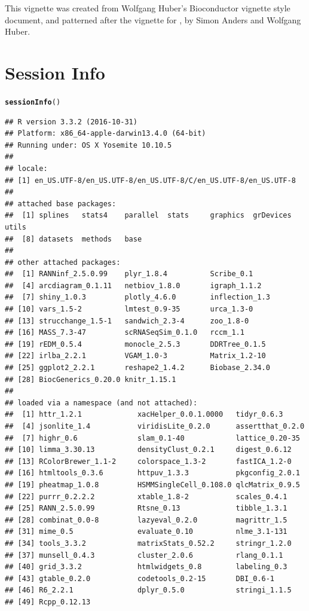 \documentclass[10pt,oneside]{article}\usepackage[]{graphicx}\usepackage[]{color}
\makeatletter
\newcommand{\hlstd}[1]{\textcolor[rgb]{0.345,0.345,0.345}{#1}}%
\newcommand{\hlkwd}[1]{\textcolor[rgb]{0.737,0.353,0.396}{\textbf{#1}}}%
\newenvironment{kframe}{%
 \def\at@end@of@kframe{}%
 \ifinner\ifhmode%
  \def\at@end@of@kframe{\end{minipage}}%
  \begin{minipage}{\columnwidth}%
 \fi\fi%
 \def\FrameCommand##1{\hskip\@totalleftmargin \hskip-\fboxsep
 \colorbox{shadecolor}{##1}\hskip-\fboxsep
     \hskip-\linewidth \hskip-\@totalleftmargin \hskip\columnwidth}%
 \MakeFramed {\advance\hsize-\width
   \@totalleftmargin\z@ \linewidth\hsize
   \@setminipage}}%
 {\par\unskip\endMakeFramed%
 \at@end@of@kframe}
\newenvironment{knitrout}{}{} %
\makeatother
\begin{document}
This vignette was created from Wolfgang Huber's Bioconductor vignette style document, and patterned after the vignette for , by Simon Anders and Wolfgang Huber.

\section{Session Info}
\begin{knitrout}
\color{fgcolor}\begin{kframe}
\begin{alltt}
\hlkwd{sessionInfo}\hlstd{()}
\end{alltt}
\begin{verbatim}
## R version 3.3.2 (2016-10-31)
## Platform: x86_64-apple-darwin13.4.0 (64-bit)
## Running under: OS X Yosemite 10.10.5
## 
## locale:
## [1] en_US.UTF-8/en_US.UTF-8/en_US.UTF-8/C/en_US.UTF-8/en_US.UTF-8
## 
## attached base packages:
##  [1] splines   stats4    parallel  stats     graphics  grDevices utils    
##  [8] datasets  methods   base     
## 
## other attached packages:
##  [1] RANNinf_2.5.0.99    plyr_1.8.4          Scribe_0.1         
##  [4] arcdiagram_0.1.11   netbiov_1.8.0       igraph_1.1.2       
##  [7] shiny_1.0.3         plotly_4.6.0        inflection_1.3     
## [10] vars_1.5-2          lmtest_0.9-35       urca_1.3-0         
## [13] strucchange_1.5-1   sandwich_2.3-4      zoo_1.8-0          
## [16] MASS_7.3-47         scRNASeqSim_0.1.0   rccm_1.1           
## [19] rEDM_0.5.4          monocle_2.5.3       DDRTree_0.1.5      
## [22] irlba_2.2.1         VGAM_1.0-3          Matrix_1.2-10      
## [25] ggplot2_2.2.1       reshape2_1.4.2      Biobase_2.34.0     
## [28] BiocGenerics_0.20.0 knitr_1.15.1       
## 
## loaded via a namespace (and not attached):
##  [1] httr_1.2.1             xacHelper_0.0.1.0000   tidyr_0.6.3           
##  [4] jsonlite_1.4           viridisLite_0.2.0      assertthat_0.2.0      
##  [7] highr_0.6              slam_0.1-40            lattice_0.20-35       
## [10] limma_3.30.13          densityClust_0.2.1     digest_0.6.12         
## [13] RColorBrewer_1.1-2     colorspace_1.3-2       fastICA_1.2-0         
## [16] htmltools_0.3.6        httpuv_1.3.3           pkgconfig_2.0.1       
## [19] pheatmap_1.0.8         HSMMSingleCell_0.108.0 qlcMatrix_0.9.5       
## [22] purrr_0.2.2.2          xtable_1.8-2           scales_0.4.1          
## [25] RANN_2.5.0.99          Rtsne_0.13             tibble_1.3.1          
## [28] combinat_0.0-8         lazyeval_0.2.0         magrittr_1.5          
## [31] mime_0.5               evaluate_0.10          nlme_3.1-131          
## [34] tools_3.3.2            matrixStats_0.52.2     stringr_1.2.0         
## [37] munsell_0.4.3          cluster_2.0.6          rlang_0.1.1           
## [40] grid_3.3.2             htmlwidgets_0.8        labeling_0.3          
## [43] gtable_0.2.0           codetools_0.2-15       DBI_0.6-1             
## [46] R6_2.2.1               dplyr_0.5.0            stringi_1.1.5         
## [49] Rcpp_0.12.13
\end{verbatim}
\end{kframe}
\end{knitrout}



\end{document}
